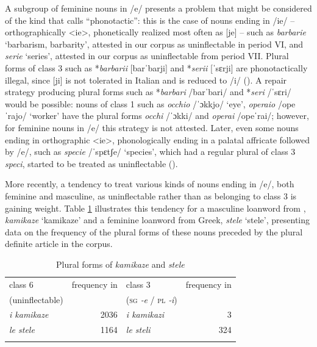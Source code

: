\documentclass[output=paper,colorlinks,citecolor=brown]{langscibook}
\begin{document}
A subgroup of feminine nouns in /e/ presents a problem that might be considered of the kind that \citet{fedden2019} calls ``phonotactic'': this is the case of nouns ending in /ie/ -- orthographically \textless ie\textgreater, phonetically realized most often as [je] -- such as \emph{barbarie} `barbarism, barbarity', attested in our corpus as uninflectable in period VI, and \emph{serie} `series', attested in our corpus as uninflectable from period VII. Plural forms of class 3 such as *\emph{barbarii} [barˈbarji] and *\emph{serii} [ˈsɛrji] are phonotactically illegal, since [ji] is not tolerated in Italian and is reduced to /i/ (\citealt[93, §64]{camilli1965}). A repair strategy producing plural forms such as *\emph{barbari} /barˈbari/ and *\emph{seri} /ˈsɛri/ would be possible: nouns of class 1 such as \emph{occhio} /ˈɔkkjo/ `eye', \emph{operaio} /opeˈrajo/ `worker' have the plural forms \emph{occhi} /ˈɔkki/ and \emph{operai} /opeˈrai/; however, for feminine nouns in /e/ this strategy is not attested. Later, even some nouns ending in orthographic \textless ie\textgreater, phonologically ending in a palatal affricate followed by /e/, such as \emph{specie} /ˈspɛtʃe/ `species', which had a regular plural of class 3 \emph{speci}, started to be treated as uninflectable (\citealt[§III.114--115]{serianni1988}).

More recently, a tendency to treat various kinds of nouns ending in /e/, both feminine and masculine, as uninflectable rather than as belonging to class 3 is gaining weight. Table \ref{10tab11} illustrates this tendency for a masculine loanword from , \emph{kamikaze} `kamikaze' and a feminine loanword from Greek, \emph{stele} `stele', presenting data on the frequency of the plural forms of these nouns preceded by the plural definite article in the  corpus.

\begin{table}[ht]
	\centering
	\begin{tabularx}{0.85\textwidth}{XrXr}
		\lsptoprule
			class 6\is{inflectional class} & frequency in & class 3 & frequency in \\
			(uninflectable) & \citetitle{ittenten20}  & (\textsc{sg} \emph{‑e} / \textsc{pl} \emph{‑i}) & \citetitle{ittenten20} \\
			\midrule
			\emph{i kamikaze} & 2036 & \emph{i kamikazi} & 3 \\
			\emph{le stele} & 1164 & \emph{le steli} & 324 \\
		\lspbottomrule
	\end{tabularx}
	\caption{Plural forms of \emph{kamikaze} and \emph{stele}}
	\label{10tab11}
\end{table}
\end{document}
